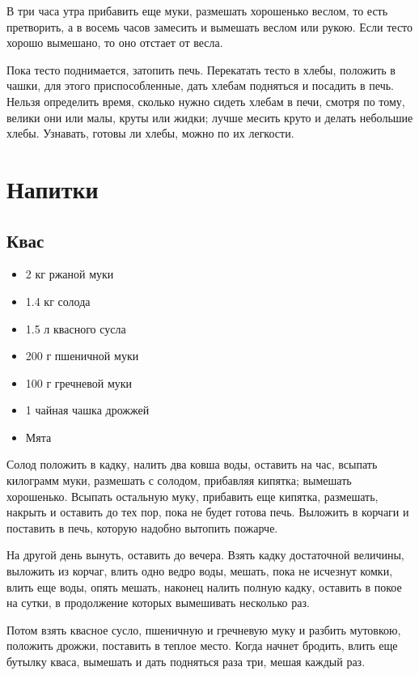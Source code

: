 В три часа утра прибавить еще муки, размешать хорошенько веслом, то есть претворить, а в восемь часов замесить и вымешать веслом или рукою. Если тесто хорошо вымешано, то оно отстает от весла.

Пока тесто поднимается, затопить печь. Перекатать тесто в хлебы, положить в чашки, для этого приспособленные, дать хлебам подняться и посадить в печь. Нельзя определить время, сколько нужно сидеть хлебам в печи, смотря по тому, велики они или малы, круты или жидки; лучше месить круто и делать небольшие хлебы. Узнавать, готовы ли хлебы, можно по их легкости.

\newpage
\section{Напитки}

\subsection{Квас}

\begin{itemize}
	\item 2 кг ржаной муки 
    \item 1.4 кг солода
    \item 1.5 л квасного сусла
    \item 200 г пшеничной муки
    \item 100 г гречневой муки 
    \item 1 чайная чашка дрожжей
    \item Мята
\end{itemize}

Солод положить в кадку, налить два ковша воды, оставить на час, всыпать килограмм муки, размешать с солодом, прибавляя кипятка; вымешать хорошенько. Всыпать остальную муку, прибавить еще кипятка, размешать, накрыть и оставить до тех пор, пока не будет готова печь. Выложить в корчаги и поставить в печь, которую надобно вытопить пожарче.

На другой день вынуть, оставить до вечера. Взять кадку достаточной величины, выложить из корчаг, влить одно ведро воды, мешать, пока не исчезнут комки, влить еще воды, опять мешать, наконец налить полную кадку, оставить в покое на сутки, в продолжение которых вымешивать несколько раз.

Потом взять квасное сусло, пшеничную и гречневую муку и разбить мутовкою, положить дрожжи, поставить в теплое место. Когда начнет бродить, влить еще бутылку кваса, вымешать и дать подняться раза три, мешая каждый раз.

